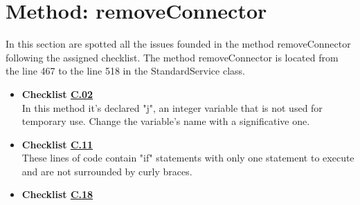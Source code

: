 \documentclass[../../../../codeInspection.tex]{subfiles}
\begin{document}
	\section{Method: removeConnector}

		In this section are spotted all the issues founded in the method removeConnector following the assigned checklist.
		The method removeConnector is located from the line 467 to the line 518 in the StandardService class.

		\begin{itemize}

			\item \textbf{Checklist \hyperref[C:02]{C.02}} \\

				  In this method it's declared "j", an integer variable that is not used for temporary use. Change the variable's name with a significative one.

			\item \textbf{Checklist \hyperref[C:11]{C.11}} \\

				  

				  

				  These lines of code contain "if" statements with only one statement to execute and are not surrounded by curly braces.

		    \item \textbf{Checklist \hyperref[C:18]{C.18}} \\

		    	  

		    	  

		    	  

		    	  

		    	  

		    	  


\end{itemize}
\end{document}

